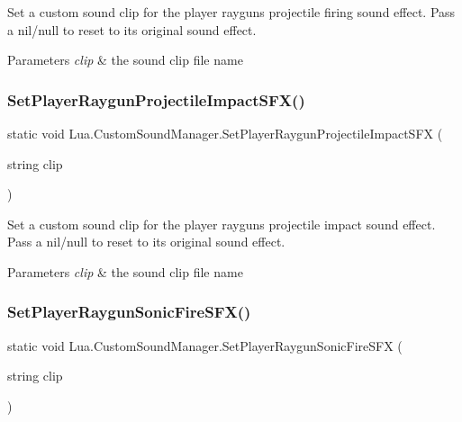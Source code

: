 Set a custom sound clip for the player raygun\textquotesingle{}s projectile firing sound effect. Pass a nil/null to reset to its original sound effect. 


\begin{DoxyParams}{Parameters}
{\em clip} & the sound clip file name\\
\hline
\end{DoxyParams}
\mbox{\label{class_lua_1_1_custom_sound_manager_a5de014d5743332790a05044b5f918ee6}} 
\subsubsection{\texorpdfstring{SetPlayerRaygunProjectileImpactSFX()}{SetPlayerRaygunProjectileImpactSFX()}}
{\footnotesize\ttfamily static void Lua.\+Custom\+Sound\+Manager.\+Set\+Player\+Raygun\+Projectile\+Impact\+S\+FX (\begin{DoxyParamCaption}\item[{string}]{clip }\end{DoxyParamCaption})\hspace{0.3cm}{\ttfamily [static]}}



Set a custom sound clip for the player raygun\textquotesingle{}s projectile impact sound effect. Pass a nil/null to reset to its original sound effect. 


\begin{DoxyParams}{Parameters}
{\em clip} & the sound clip file name\\
\hline
\end{DoxyParams}
\mbox{\label{class_lua_1_1_custom_sound_manager_a923ad0297c9ec8e83ec48880b29a7670}} 
\subsubsection{\texorpdfstring{SetPlayerRaygunSonicFireSFX()}{SetPlayerRaygunSonicFireSFX()}}
{\footnotesize\ttfamily static void Lua.\+Custom\+Sound\+Manager.\+Set\+Player\+Raygun\+Sonic\+Fire\+S\+FX (\begin{DoxyParamCaption}\item[{string}]{clip }\end{DoxyParamCaption})\hspace{0.3cm}{\ttfamily [static]}}



